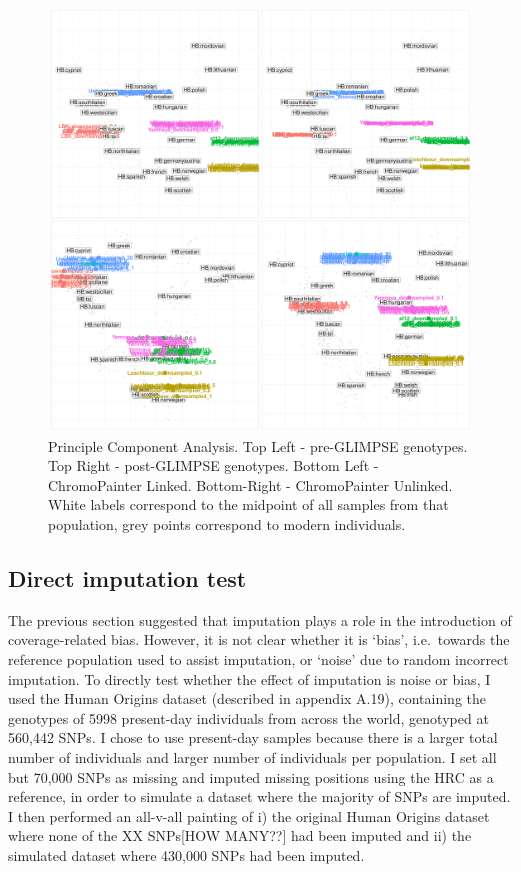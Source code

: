 \begin{figure}[htp]
    \centering
    \includegraphics[width=1.0\textwidth]{../images/chapter1/CP_linked_unlinked_pre_post_GLIMPSE_PCA.pdf}
    \caption{Principle Component Analysis. Top Left - pre-GLIMPSE genotypes. Top Right - post-GLIMPSE genotypes. Bottom Left - ChromoPainter Linked. Bottom-Right - ChromoPainter Unlinked. White labels correspond to the midpoint of all samples from that population, grey points correspond to modern individuals.}
    \label{fig:pre_GLIMPSE_PCA}
\end{figure}




\subsection{Direct imputation test}

The previous section suggested that imputation plays a role in the introduction of coverage-related bias. However, it is not clear whether it is `bias', i.e.\ towards the reference population used to assist imputation, or `noise' due to random incorrect imputation. To directly test whether the effect of imputation is noise or bias, I used the Human Origins dataset (described in appendix A.19), containing the genotypes of 5998 present-day individuals from across the world, genotyped at 560,442 SNPs. I chose to use present-day samples because there is a larger total number of individuals and larger number of individuals per population. I set all but 70,000 SNPs as missing and imputed missing positions using the HRC as a reference, in order to simulate a dataset where the majority of SNPs are imputed. I then performed an all-v-all painting of i) the original Human Origins dataset where none of the {\color{red}XX SNPs[HOW MANY??]} had been imputed and ii) the simulated dataset where 430,000 SNPs had been imputed. 

